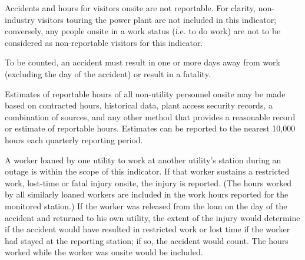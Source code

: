 Accidents and hours for visitors onsite are not reportable. For
clarity, non-industry visitors touring the power plant are not
included in this indicator; conversely, any people onsite in a work
status (i.e. to do work) are not to be considered as non-reportable
visitors for this indicator.

To be counted, an accident must result in one or more days away from
work (excluding the day of the accident) or result in a fatality.

Estimates of reportable hours of all non-utility personnel onsite may
be made based on contracted hours, historical data, plant access
security records, a combination of sources, and any other method that
provides a reasonable record or estimate of reportable
hours. Estimates can be reported to the nearest 10,000 hours each
quarterly reporting period.

A worker loaned by one utility to work at another utility’s station
during an outage is within the scope of this indicator. If that worker
sustains a restricted work, lost-time or fatal injury onsite, the
injury is reported. (The hours worked by all similarly loaned workers
are included in the work hours reported for the monitored station.)
If the worker was released from the loan on the day of the accident
and returned to his own utility, the extent of the injury would
determine if the accident would have resulted in restricted work or
lost time if the worker had stayed at the reporting station; if so,
the accident would count. The hours worked while the worker was onsite
would be included.

